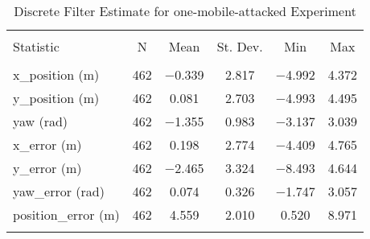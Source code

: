 
\begin{table}[htbp] \centering 
  \caption{Discrete Filter Estimate for one-mobile-attacked Experiment} 
  \label{tab:one_mobile_attacked_discrete_summary} 
\begin{tabular}{@{\extracolsep{5pt}}lccccc} 
\\[-1.8ex]\hline 
\hline \\[-1.8ex] 
Statistic & \multicolumn{1}{c}{N} & \multicolumn{1}{c}{Mean} & \multicolumn{1}{c}{St. Dev.} & \multicolumn{1}{c}{Min} & \multicolumn{1}{c}{Max} \\ 
\hline \\[-1.8ex] 
x\_position (m) & 462 & \num{-0.339} & \num{2.817} & \num{-4.992} & \num{4.372} \\ 
y\_position (m) & 462 & \num{0.081} & \num{2.703} & \num{-4.993} & \num{4.495} \\ 
yaw (rad) & 462 & \num{-1.355} & \num{0.983} & \num{-3.137} & \num{3.039} \\ 
x\_error (m) & 462 & \num{0.198} & \num{2.774} & \num{-4.409} & \num{4.765} \\ 
y\_error (m) & 462 & \num{-2.465} & \num{3.324} & \num{-8.493} & \num{4.644} \\ 
yaw\_error (rad) & 462 & \num{0.074} & \num{0.326} & \num{-1.747} & \num{3.057} \\ 
position\_error (m) & 462 & \num{4.559} & \num{2.010} & \num{0.520} & \num{8.971} \\ 
\hline \\[-1.8ex] 
\end{tabular} 
\end{table} 

